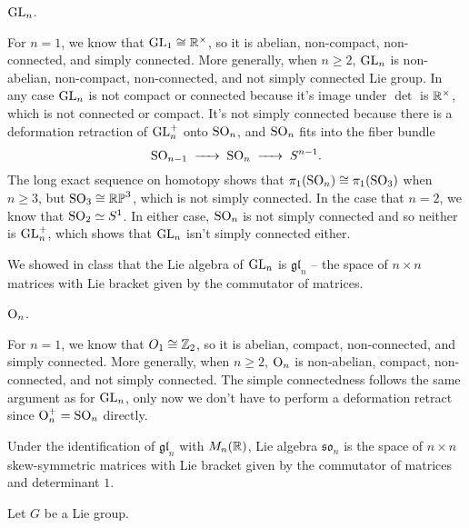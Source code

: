 \documentclass{../../templates/lkx_pset}
\begin{document}
\begin{parts}
	\begin{part}{}
		$\operatorname{GL}_n$.
	\end{part}

	For $n=1$, we know that $\operatorname{GL}_1\cong \mathbb{R}^\times$, so it is abelian, non-compact, non-connected, and simply connected. More generally, when $n\geq 2$, $\operatorname{GL}_n$ is non-abelian, non-compact, non-connected, and not simply connected Lie group. In any case $\operatorname{GL}_n$ is not compact or connected because it's image under $\det$ is $\mathbb{R}^\times$, which is not connected or compact. It's not simply connected because there is a deformation retraction of $\operatorname{GL}^+_n$ onto $\operatorname{SO}_n$, and $\operatorname{SO}_n$ fits into the fiber bundle
	\[
		\SO_{n-1} \longto \SO_n \longto S^{n-1}.
	\]
	The long exact sequence on homotopy shows that $\pi_1(\operatorname{SO}_n)\cong \pi_1(\operatorname{SO}_3)$ when $n\geq 3$, but $\operatorname{SO}_3\cong \mathbb{RP}^3$, which is not simply connected. In the case that $n=2$, we know that $\operatorname{SO}_2\simeq S^1$. In either case, $\operatorname{SO}_n$ is not simply connected and so neither is $\operatorname{GL}^+_n$, which shows that $\operatorname{GL}_n$ isn't simply connected either.

	We showed in class that the Lie algebra of $\operatorname{GL}_n$ is $\mathfrak{gl}_n$ -- the space of $n\times n$ matrices with Lie bracket given by the commutator of matrices.

	\begin{part}{}
		$\operatorname{O}_n$.
	\end{part}

	For $n=1$, we know that $O_1\cong \mathbb{Z}_2$, so it is abelian, compact, non-connected, and simply connected. More generally, when $n\geq 2$, $\operatorname{O}_n$ is non-abelian, compact, non-connected, and not simply connected. The simple connectedness follows the same argument as for $\operatorname{GL}_n$, only now we don't have to perform a deformation retract since $\operatorname{O}_n^+=\operatorname{SO}_n$ directly.

	Under the identification of $\mathfrak{gl}_n$ with $M_n(\mathbb{R})$, Lie algebra $\mathfrak{so}_n$ is the space of $n\times n$ skew-symmetric matrices with Lie bracket given by the commutator of matrices and determinant $1$.
\end{parts}

\begin{problem}{5}
Let $G$ be a Lie group.
\end{problem}
\end{document}
